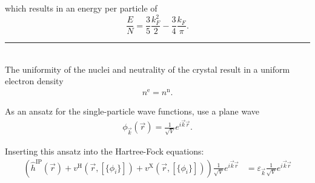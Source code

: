\documentclass{article}
\newcommand{\lr}[1]{\left(#1\right)}
\begin{document}
which results in an energy per particle of
	\begin{equation}
		\frac{E}{N} = \frac{3}{5}\frac{k_F^2}{2} - \frac{3}{4}\frac{k_F}{\pi}.
	\end{equation}


\newpage


{\color{violet}
\hrule
	\\
	The uniformity of the nuclei and neutrality of the crystal result in a uniform electron density
		\begin{align*}
			n^\text{e} = n^\text{n}.
		\end{align*}

	As an ansatz for the single-particle wave functions, use a plane wave
		\begin{align*}
			\phi_{\vec{k}}(\vec{r}) = \frac{1}{\sqrt{V}} e^{i\vec{k}\vec{r}}.
		\end{align*}
	
	Inserting this ansatz into the Hartree-Fock equations:
		\begin{align*}
			\lr{ \hat{h}^\text{IP}(\vec{r}) + v^\text{H}(\vec{r},[\{\phi_i\}]) + v^\text{X}(\vec{r},[\{\phi_i\}]) } \frac{1}{\sqrt{V}} e^{i\vec{k}\vec{r}} &= \varepsilon_{\vec{k}} \frac{1}{\sqrt{V}} e^{i\vec{k}\vec{r}} \\
		\end{align*}
	
}
\end{document}
